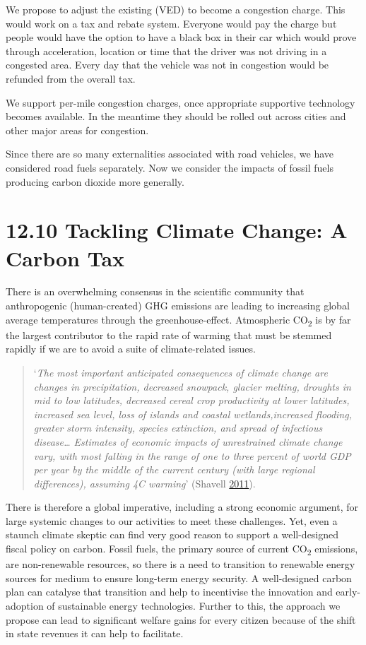 \documentclass[]{tufte-handout}
\begin{document}
We propose to adjust the existing (VED) to become a congestion charge.
This would work on a tax and rebate system. Everyone would pay the
charge but people would have the option to have a black box in their car
which would prove through acceleration, location or time that the driver
was not driving in a congested area. Every day that the vehicle was not
in congestion would be refunded from the overall tax.

We support per-mile congestion charges, once appropriate supportive
technology becomes available. In the meantime they should be rolled out
across cities and other major areas for congestion.

Since there are so many externalities associated with road vehicles, we
have considered road fuels separately. Now we consider the impacts of
fossil fuels producing carbon dioxide more generally.

\hypertarget{tackling-climate-change-a-carbon-tax}{%
\section{12.10 Tackling Climate Change: A Carbon
Tax}\label{tackling-climate-change-a-carbon-tax}}

There is an overwhelming consensus in the scientific community that
anthropogenic (human-created) GHG emissions are leading to increasing
global average temperatures through the greenhouse-effect. Atmospheric
CO\textsubscript{2} is by far the largest contributor to the rapid rate
of warming that must be stemmed rapidly if we are to avoid a suite of
climate-related issues.

\begin{quote}
`\emph{The most important anticipated consequences of climate change are
changes in precipitation, decreased snowpack, glacier melting, droughts
in mid to low latitudes, decreased cereal crop productivity at lower
latitudes, increased sea level, loss of islands and coastal
wetlands,increased flooding, greater storm intensity, species
extinction, and spread of infectious disease\ldots{} Estimates of
economic impacts of unrestrained climate change vary, with most falling
in the range of one to three percent of world GDP per year by the middle
of the current century (with large regional differences), assuming 4C
warming}' (Shavell \protect\hyperlink{ref-Shavell2011}{2011}).
\end{quote}

There is therefore a global imperative, including a strong economic
argument, for large systemic changes to our activities to meet these
challenges. Yet, even a staunch climate skeptic can find very good
reason to support a well-designed fiscal policy on carbon. Fossil fuels,
the primary source of current CO\textsubscript{2} emissions, are
non-renewable resources, so there is a need to transition to renewable
energy sources for medium to ensure long-term energy security. A
well-designed carbon plan can catalyse that transition and help to
incentivise the innovation and early-adoption of sustainable energy
technologies. Further to this, the approach we propose can lead to
significant welfare gains for every citizen because of the shift in
state revenues it can help to facilitate.
\end{document}
